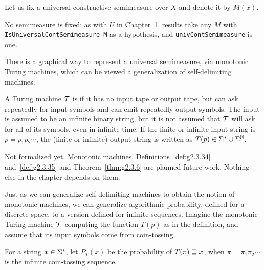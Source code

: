 \begin{definition}
  \label{def:g2.3.32}
  \leanok
  Let us fix a universal constructive semimeasure over \( X \) and denote it by
\( M(x) \).
\end{definition}

\begin{formalization}
No semimeasure is fixed: as with \( U \) in Chapter~1, results take any \( M \) with
\texttt{IsUniversalContSemimeasure M} as a hypothesis, and \texttt{univContSemimeasure} is one.
\end{formalization}

There is a graphical way to represent a universal semimeasure, via monotonic
Turing machines, which can be viewed a generalization of self-delimiting
machines.

\begin{definition}
  \label{def:g2.3.33}
A Turing machine \( \mathcal{T} \) is  if it
has no input tape or output tape, but can ask repeatedly for input symbols and can emit
repeatedly output symbols.
The input is assumed to be an infinite binary string, but it is not assumed that
\( \mathcal{T} \) will ask for all of its symbols, even in infinite time.
If the finite or
infinite input string is \( p=p_{1}p_{2}\dotsm \), the (finite or infinite) output string is
written as \( T(p)\in\Sigma^{*}\cup\Sigma^{\mathbb{N}} \).
\end{definition}

\begin{formalization}
Not formalized yet. Monotonic machines, Definitions~\ref{def:g2.3.34} and~\ref{def:g2.3.35}
and Theorem~\ref{thm:g2.3.6} are planned future work. Nothing else in the chapter depends on
them.
\end{formalization}

Just as we can generalize self-delimiting machines to obtain the notion of
monotonic machines, we can generalize algorithmic probability, defined for a
discrete space, to a version defined for infinite sequences.
Imagine the monotonic Turing machine \( \mathcal{T} \) computing the function \( T(p) \)
as in the definition, and assume that its input symbols come from coin-tossing.

\begin{definition}
  \label{def:g2.3.34}
For a string \( x\in\Sigma^{*} \), let \( P_{T}(x) \) be the probability of \( T(\pi)\sqsupseteq x \),
when \( \pi=\pi_{1}\pi_{2}\dotsm \) is the infinite coin-tossing sequence.
\end{definition}

